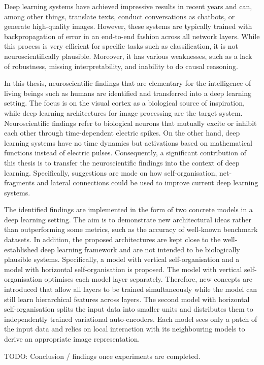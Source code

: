 Deep learning systems have achieved impressive results in recent years and can, among other things, translate texts, conduct conversations as chatbots, or generate high-quality images. However, these systems are typically trained with backpropagation of error in an end-to-end fashion across all network layers. While this process is very efficient for specific tasks such as classification, it is not neuroscientifically plausible. Moreover, it has various weaknesses, such as a lack of robustness, missing interpretability, and inability to do causal reasoning.

In this thesis, neuroscientific findings that are elementary for the intelligence of living beings such as humans are identified and transferred into a deep learning setting. The focus is on the visual cortex as a biological source of inspiration, while deep learning architectures for image processing are the target system. Neuroscientific findings refer to biological neurons that mutually excite or inhibit each other through time-dependent electric spikes. On the other hand, deep learning systems have no time dynamics but activations based on mathematical functions instead of electric pulses. Consequently, a significant contribution of this thesis is to transfer the neuroscientific findings into the context of deep learning. Specifically, suggestions are made on how self-organisation, net-fragments and lateral connections could be used to improve current deep learning systems.

The identified findings are implemented in the form of two concrete models in a deep learning setting. The aim is to demonstrate new architectural ideas rather than outperforming some metrics, such as the accuracy of well-known benchmark datasets. In addition, the proposed architectures are kept close to the well-established deep learning framework and are not intended to be biologically plausible systems. Specifically, a model with vertical self-organisation and a model with horizontal self-organisation is proposed. The model with vertical self-organisation optimises each model layer separately. Therefore, new concepts are introduced that allow all layers to be trained simultaneously while the model can still learn hierarchical features across layers. The second model with horizontal self-organisation splits the input data into smaller units and distributes them to independently trained variational auto-encoders. Each model sees only a patch of the input data and relies on local interaction with its neighbouring models to derive an appropriate image representation.

TODO: Conclusion / findings once experiments are completed.